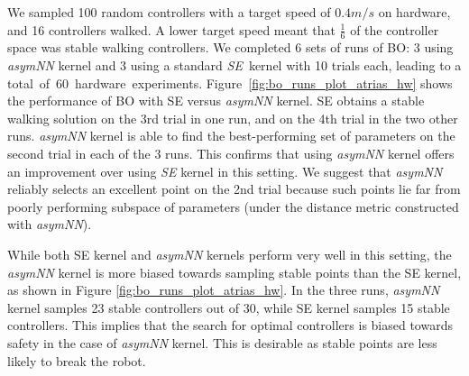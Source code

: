 

We sampled 100 random controllers with a target speed of $0.4m/s$ on hardware, and 16 controllers walked. A lower target speed meant that $\frac{1}{6}$ of the controller space was stable walking controllers. We completed 6 sets of runs of BO: 3 using \textit{asymNN} kernel and 3 using a standard \mbox{\textit{SE} kernel} with 10 trials each, leading to a \mbox{total of 60 hardware experiments}. Figure~\ref{fig:bo_runs_plot_atrias_hw} shows the performance of BO with SE versus \textit{asymNN} kernel. SE obtains a stable walking solution on the 3rd trial in one run, and on the 4th trial in the two other runs. \textit{asymNN} kernel is able to find the best-performing set of parameters on the second trial in each of the 3 runs. This confirms that using \textit{asymNN} kernel offers an improvement over using \textit{SE} kernel in this setting. We suggest that \textit{asymNN} reliably selects an excellent point on the 2nd trial  because such points lie far from  poorly performing subspace of parameters (under the distance metric constructed with \textit{asymNN}). 

While both SE kernel and \textit{asymNN} kernels perform very well in this setting, the \textit{asymNN} kernel is more biased towards sampling stable points than the SE kernel, as shown in Figure \ref{fig:bo_runs_plot_atrias_hw}. In the three runs, \textit{asymNN} kernel samples 23 stable controllers out of 30, while SE kernel samples 15 stable controllers. This implies that the search for optimal controllers is biased towards safety in the case of \textit{asymNN} kernel. This is desirable as stable points are less likely to break the robot.

